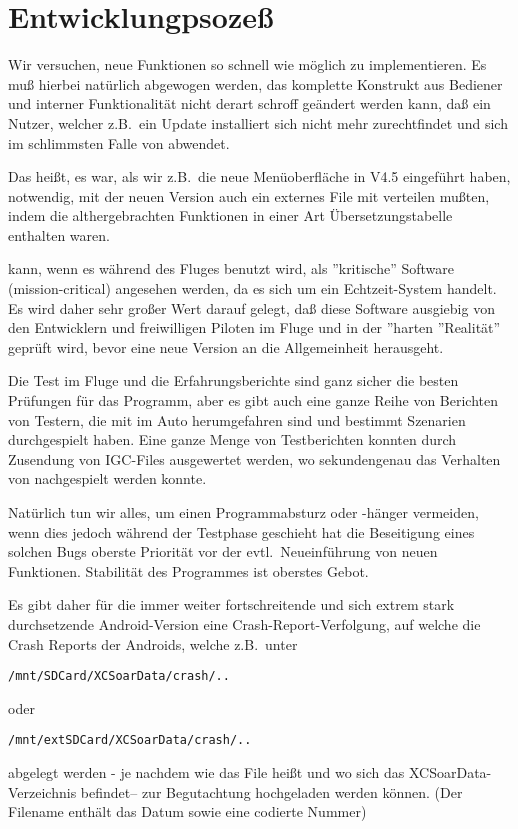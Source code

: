 \section{Entwicklungpsozeß}

Wir versuchen, neue Funktionen so schnell wie möglich zu implementieren. Es muß hierbei natürlich abgewogen werden, das komplette Konstrukt
aus Bediener und interner Funktionalität nicht derart schroff geändert werden kann, daß ein Nutzer, welcher z.B.\ ein Update installiert sich nicht
mehr zurechtfindet und sich im schlimmsten Falle von \xc abwendet.

Das heißt, es war, als wir z.B.\ die neue Menüoberfläche in V4.5 eingeführt haben,  notwendig, mit der neuen Version  auch ein externes
File mit verteilen mußten, indem die althergebrachten Funktionen in einer Art Übersetzungstabelle enthalten waren.

\xc kann, wenn es während des Fluges benutzt wird, als ''kritische'' Software  (mission-critical) angesehen werden, da es sich um ein Echtzeit-System handelt.
Es wird daher sehr großer Wert darauf gelegt, daß diese Software ausgiebig von den Entwicklern und  freiwilligen Piloten im Fluge und in der ''harten ''Realität'' geprüft wird,
bevor eine neue Version an die Allgemeinheit herausgeht.

Die Test im Fluge und die Erfahrungsberichte sind ganz sicher die besten  Prüfungen für das Programm, aber es gibt auch eine ganze Reihe 
von Berichten von Testern, die mit \xc im Auto herumgefahren sind und bestimmt Szenarien durchgespielt haben.  Eine ganze Menge von 
Testberichten konnten durch Zusendung von  IGC-Files ausgewertet werden, wo sekundengenau das Verhalten von \xc nachgespielt werden konnte.

Natürlich tun wir alles, um einen Programmabsturz oder -hänger vermeiden, wenn dies jedoch während der Testphase geschieht hat die Beseitigung eines solchen 
Bugs oberste Priorität vor der evtl.\  Neueinführung von neuen Funktionen.
Stabilität des Programmes ist oberstes Gebot.


Es gibt daher für die immer weiter fortschreitende und sich extrem stark durchsetzende Android-Version eine Crash-Report-Verfolgung,
auf welche die Crash Reports der Androids, welche z.B.\  unter
\begin{tabbing}
{\small\texttt{/mnt/SDCard/XCSoarData/crash/..}}\\
\qquad{}
\end{tabbing}
oder
\begin{tabbing}
{\small\texttt{/mnt/extSDCard/XCSoarData/crash/..}}\\
\qquad{}
\end{tabbing}
abgelegt werden - je nachdem wie das File heißt und wo sich das XCSoarData-Verzeichnis befindet--
zur Begutachtung hochgeladen werden können. (Der Filename enthält das Datum sowie eine codierte Nummer)


